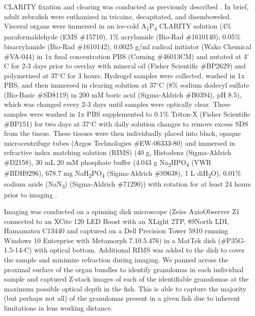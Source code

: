 CLARITY fixation and clearing was conducted as previously described \citep{Cronan2015}. In brief, adult zebrafish were euthanized in tricaine, decapitated, and disemboweled. Visceral organs were immersed in an ice\hyp{}cold A\textsubscript{1}P\textsubscript{4} CLARITY solution (4\% paraformaldehyde (EMS \#15710), 1\% acrylamide (Bio\hyp{}Rad \#1610140), 0.05\% bisacrylamide (Bio\hyp{}Rad \#1610142), 0.0025 g/ml radical initiator (Wako Chemical \#VA\hyp{}044) in 1x final concentration PBS (Corning \#46013CM) and nutated at 4$^{\circ}$C for 2\hyp{}3 days prior to overlay with mineral oil (Fisher Scientific \#BP2629) and polymerized at 37$^{\circ}$C for 3 hours. Hydrogel samples were collected, washed in 1x PBS, and then immersed in clearing solution at 37$^{\circ}$C (8\% sodium dodecyl sulfate (Bio\hyp{}Basic \#SD8119) in 200 mM boric acid (Sigma\hyp{}Aldrich \#B0394), pH 8.5), which was changed every 2\hyp{}3 days until samples were optically clear. These samples were washed in 1x PBS supplemented to 0.1\% Triton\hyp{}X (Fisher Scientific \#BP151) for two days at 37$^{\circ}$C with daily solution changes to remove excess SDS from the tissue. These tissues were then individually placed into black, opaque microcentrifuge tubes (Argos Technologies \#EW\hyp{}06333\hyp{}80) and immersed in refractive index matching solution (RIMS) (40 g, Histodenz (Sigma\hyp{}Aldrich \#D2158), 30 mL 20 mM phosphate buffer (4.043 g Na\textsubscript{2}HPO\textsubscript{4} (VWR \#BDH9296), 678.7 mg NaH\textsubscript{2}PO\textsubscript{4} (Sigma\hyp{}Aldrich \#S9638), 1 L diH\textsubscript{2}O), 0.01\% sodium azide (NaN\textsubscript{3}) (Sigma\hyp{}Aldrich \#71290)) with rotation for at least 24 hours prior to imaging \citep{Yang2014d}. 

Imaging was conducted on a spinning disk microscope (Zeiss AxioObserver Z1 connected to an XCite 120 LED Boost with an XLight 2TP, 89North LDI, Hamamatsu C13440 and captured on a Dell Precision Tower 5810 running Windows 10 Enterprise with Metamorph 7.10.5.476) in a MatTek dish (\#P35G\hyp{}1.5\hyp{}14\hyp{}C) with optical bottom. Additional RIMS was added to the dish to cover the sample and minimize refraction during imaging. We panned across the proximal surface of the organ bundles to identify granulomas in each individual sample and captured Z\hyp{}stack images of each of the identifiable granulomas at the maximum possible optical depth in the fish. This is able to capture the majority (but perhaps not all) of the granulomas present in a given fish due to inherent limitations in lens working distance.

